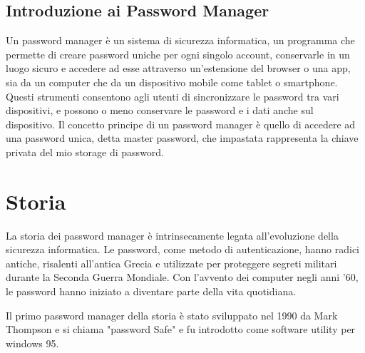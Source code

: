 \documentclass[a4paper,12pt]{report}
\begin{document}
		\subsection*{Introduzione ai Password Manager} 
		Un password manager è un sistema di
		sicurezza informatica, un programma che permette di creare password uniche per
		ogni singolo account, conservarle in un luogo sicuro e accedere ad esse
		attraverso un’estensione del browser o una app, sia da un computer che da un
		dispositivo mobile come tablet o smartphone. Questi strumenti consentono agli
		utenti di sincronizzare le password tra vari dispositivi, e possono o meno
		conservare le password e i dati anche sul dispositivo.
		Il concetto principe di un password manager è quello di accedere
		ad una password unica, detta master password, che impastata
		rappresenta la chiave privata del mio storage di password.

		\section{Storia} 
		La storia dei password manager è intrinsecamente legata all'evoluzione della
		sicurezza informatica. Le password, come metodo di autenticazione, hanno radici
		antiche, risalenti all'antica Grecia e utilizzate per proteggere segreti
		militari durante la Seconda Guerra Mondiale. Con l'avvento dei computer negli
		anni '60, le password hanno iniziato a diventare parte della vita quotidiana.

		Il primo password manager della storia è stato sviluppato nel 1990 da Mark
		Thompson \cite{password-manager-hystory} e si chiama "password Safe" e 
		fu introdotto come software utility per windows 95. 
\end{document}
